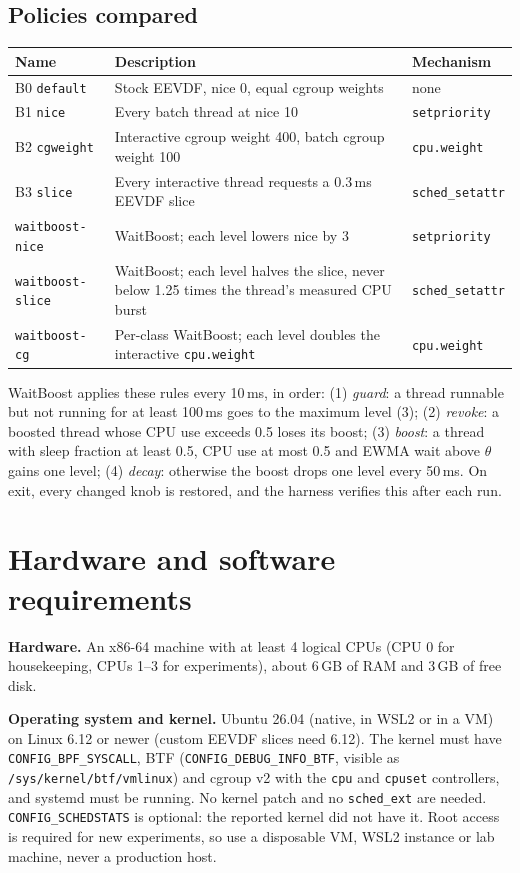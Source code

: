 \documentclass[10.5pt,a4paper]{article}
\newcommand{\f}[1]{\texttt{#1}}
\begin{document}
\subsection{Policies compared}
\begin{tabularx}{\textwidth}{@{}l L l@{}}
\toprule
\textbf{Name} & \textbf{Description} & \textbf{Mechanism} \\
\midrule
B0 \f{default} & Stock EEVDF, nice 0, equal cgroup weights & none \\
B1 \f{nice} & Every batch thread at nice 10 & \f{setpriority} \\
B2 \f{cgweight} & Interactive cgroup weight 400, batch cgroup weight 100 & \f{cpu.weight} \\
B3 \f{slice} & Every interactive thread requests a 0.3\,ms EEVDF slice & \f{sched\_setattr} \\
\f{waitboost-nice} & WaitBoost; each level lowers nice by 3 & \f{setpriority} \\
\f{waitboost-slice} & WaitBoost; each level halves the slice, never below 1.25 times the thread's measured CPU burst & \f{sched\_setattr} \\
\f{waitboost-cg} & Per-class WaitBoost; each level doubles the interactive \f{cpu.weight} & \f{cpu.weight} \\
\bottomrule
\end{tabularx}

WaitBoost applies these rules every 10\,ms, in order: (1) \emph{guard}: a thread runnable but not running for at least 100\,ms goes to the maximum level (3); (2) \emph{revoke}: a boosted thread whose CPU use exceeds 0.5 loses its boost; (3) \emph{boost}: a thread with sleep fraction at least 0.5, CPU use at most 0.5 and EWMA wait above $\theta$ gains one level; (4) \emph{decay}: otherwise the boost drops one level every 50\,ms. On exit, every changed knob is restored, and the harness verifies this after each run.

\section{Hardware and software requirements}

\textbf{Hardware.} An x86-64 machine with at least 4 logical CPUs (CPU 0 for housekeeping, CPUs 1--3 for experiments), about 6\,GB of RAM and 3\,GB of free disk.

\textbf{Operating system and kernel.} Ubuntu 26.04 (native, in WSL2 or in a VM) on Linux 6.12 or newer (custom EEVDF slices need 6.12). The kernel must have \f{CONFIG\_BPF\_SYSCALL}, BTF (\f{CONFIG\_DEBUG\_INFO\_BTF}, visible as \f{/sys/kernel/btf/vmlinux}) and cgroup v2 with the \f{cpu} and \f{cpuset} controllers, and systemd must be running. No kernel patch and no \f{sched\_ext} are needed. \f{CONFIG\_SCHEDSTATS} is optional: the reported kernel did not have it. Root access is required for new experiments, so use a disposable VM, WSL2 instance or lab machine, never a production host.
\end{document}
